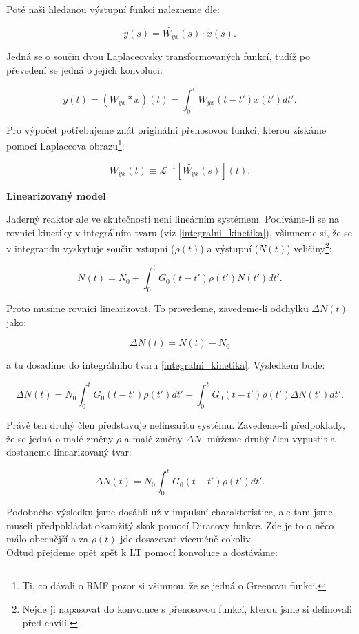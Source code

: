 Poté naši hledanou výstupní funkci nalezneme dle:

$$ \tilde{y}(s) = \tilde{W_{yx}}(s) \cdot \tilde{x}(s). $$

Jedná se o součin dvou Laplaceovsky transformovaných funkcí, tudíž po převedení se jedná o jejich konvoluci:

$$ y(t) = (W_{yx} * x ) (t) = \int_0^t W_{yx}(t-t') x(t') dt'. $$

Pro výpočet potřebujeme znát originální přenosovou funkci, kterou získáme pomocí Laplaceova obrazu\footnote{Ti, co dávali o RMF pozor si všimnou, že se jedná o Greenovu funkci.}:

$$ W_{yx}(t) \equiv \mathcal{L}^{-1}[\tilde{W_{yx}}(s)](t). $$

\textbf{Linearizovaný model}

Jaderný reaktor ale ve skutečnosti není lineárním systémem. Podíváme-li se na rovnici kinetiky v integrálním tvaru (viz \eqref{integralni_kinetika}), všimneme si, že se v integrandu vyskytuje součin vstupní ($\rho(t)$) a výstupní ($N(t)$) veličiny\footnote{Nejde ji napasovat do konvoluce s přenosovou funkcí, kterou jsme si definovali před chvílí.}:

$$ N(t) = N_0 + \int_0^t G_0(t-t') \rho(t') N(t')dt'. $$

Proto musíme rovnici linearizovat. To provedeme, zavedeme-li odchylku $\Delta N(t)$ jako:

$$ \Delta N(t) = N(t) - N_0 $$

a tu dosadíme do integrálního tvaru \eqref{integralni_kinetika}. Výsledkem bude:

$$ \Delta N(t) = N_0 \int_0^t G_0(t-t') \rho(t') dt' + \int_0^t G_0(t-t') \rho(t') \Delta N(t')dt'. $$

Právě ten druhý člen představuje nelinearitu systému. Zavedeme-li předpoklady, že se jedná o malé změny $\rho$ a malé změny $\Delta N$, můžeme druhý člen vypustit a dostaneme linearizovaný tvar:

\begin{equation}
  \boxed{
  \Delta N(t) = N_0 \int_0^t G_0(t-t') \rho(t') dt'.
  \label{linearizovana_kinetika}}
\end{equation}

Podobného výsledku jsme dosáhli už v impulsní charakteristice, ale tam jsme museli předpokládat okamžitý skok pomocí Diracovy funkce. Zde je to o něco málo obecnější a za $\rho(t)$ jde dosazovat víceméně cokoliv.\\

Odtud přejdeme opět zpět k LT pomocí konvoluce a dostáváme:

